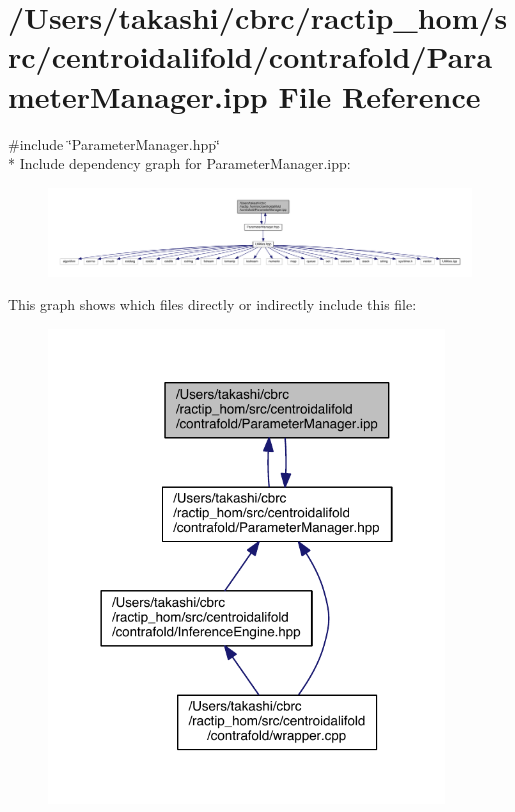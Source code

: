 \hypertarget{centroidalifold_2contrafold_2_parameter_manager_8ipp}{\section{/\+Users/takashi/cbrc/ractip\+\_\+hom/src/centroidalifold/contrafold/\+Parameter\+Manager.ipp File Reference}
\label{centroidalifold_2contrafold_2_parameter_manager_8ipp}
}
{\ttfamily \#include \char`\"{}Parameter\+Manager.\+hpp\char`\"{}}\\*
Include dependency graph for Parameter\+Manager.\+ipp\+:
\nopagebreak
\begin{figure}[H]
\begin{center}
\leavevmode
\includegraphics[width=350pt]{centroidalifold_2contrafold_2_parameter_manager_8ipp__incl}
\end{center}
\end{figure}
This graph shows which files directly or indirectly include this file\+:
\nopagebreak
\begin{figure}[H]
\begin{center}
\leavevmode
\includegraphics[width=298pt]{centroidalifold_2contrafold_2_parameter_manager_8ipp__dep__incl}
\end{center}
\end{figure}
